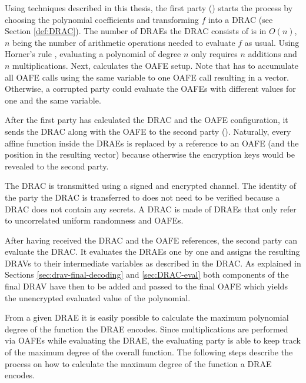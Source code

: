 Using techniques described in this thesis, the first party (\JWpOne{}) starts
the process by choosing the polynomial coefficients and transforming  $f$ into a
DRAC (see Section \ref{def:DRAC}). The number of DRAEs the DRAC consists of is
in $O(n)$, $n$ being the number of arithmetic operations needed to evaluate $f$
as usual. Using Horner's rule \cite{cormen01}, evaluating a polynomial of degree
$n$ only requires $n$ additions and $n$ multiplications. Next, \JWpOne{}
calculates the OAFE setup. Note that \JWpOne{} has to accumulate all OAFE calls
using the same variable to one OAFE call resulting in a vector. Otherwise, a
corrupted party could evaluate the OAFEs with different values for one and the
same variable.

After the first party has calculated the DRAC and the OAFE configuration, it
sends the DRAC along with the OAFE to the second party (\JWpTwo{}). Naturally,
every affine function inside the DRAEs is replaced by a reference to an OAFE
(and the position in the resulting vector) because otherwise the encryption keys
would be revealed to the second party.

The DRAC is transmitted using a signed and encrypted channel. The identity of
the party the DRAC is transferred to does not need to be verified because a DRAC
does not contain any secrets. A DRAC is made of DRAEs that only refer to
uncorrelated uniform randomness and OAFEs.

After having received the DRAC and the OAFE references, the second party can
evaluate the DRAC\@. It evaluates the DRAEs one by one and assigns the resulting
DRAVs to their intermediate variables as described in the DRAC\@. As explained
in Sections \ref{sec:drav-final-decoding} and \ref{sec:DRAC-eval} both
components of the final DRAV have then to be added and passed to the final OAFE
which yields the unencrypted evaluated value of the polynomial.


\label{sec:max-poly-degree}

From a given DRAE it is easily possible to calculate the maximum polynomial
degree of the function the DRAE encodes. Since multiplications are performed via
OAFEs while evaluating the DRAE, the evaluating party is able to keep track of
the maximum degree of the overall function. The following steps describe the
process on how to calculate the maximum degree of the function a DRAE encodes.

